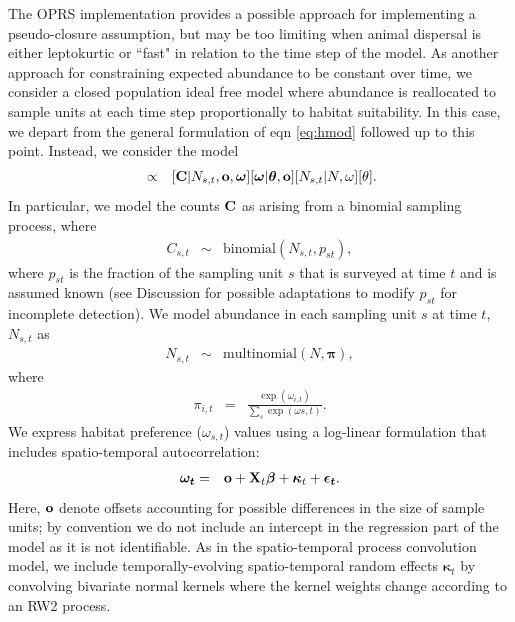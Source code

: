 \documentclass[times,mee,doublespace,]{besauth2}
\begin{document}
The OPRS implementation provides a possible approach for implementing a pseudo-closure assumption, but may be too limiting when animal dispersal is either leptokurtic or ``fast" in relation to the time step of the model.  As another approach for constraining expected abundance to be constant over time, we consider a closed population
ideal free model where abundance is reallocated to sample units at each time step proportionally to habitat suitability.  In this case, we depart from the general formulation of eqn \ref{eq:hmod} followed up to this point.  Instead, we consider the model
\begin{eqnarray}
  [N, N_{s,t}, \boldsymbol{\omega},\boldsymbol{\theta} | {\bf C},{\bf o},{\bf p}] & \propto & [{\bf C} | N_{s,t}, {\bf o}, \boldsymbol{\omega}] [\boldsymbol{\omega} | \boldsymbol{\theta},{\bf o}] [N_{s,t}|N,\omega] [\theta].
  \label{eq:cpif-post}
\end{eqnarray}
In particular, we model the counts ${\bf C}$ as arising from a binomial sampling process, where
\begin{eqnarray*}
  C_{s,t} & \sim & \textrm{binomial}(N_{s,t}, p_{st}),
\end{eqnarray*}
where $p_{st}$ is the fraction of the sampling unit $s$ that is surveyed at time $t$ and is assumed known (see Discussion for possible adaptations to modify $p_{st}$ for incomplete detection).
We model abundance in each sampling unit $s$ at time $t$, $N_{s,t}$ as
\begin{eqnarray*}
  N_{s,t} & \sim & \textrm{multinomial}(N, \boldsymbol{\pi}),
\end{eqnarray*}
where
\begin{eqnarray*}
  \pi_{i,t} & = & \frac{\exp(\omega_{i,t})}{\sum_s \exp(\omega{s,t})}.
\end{eqnarray*}
We express habitat preference ($\omega_{s,t}$) values using a log-linear formulation that includes spatio-temporal autocorrelation:
\begin{eqnarray*}
  \boldsymbol{\omega_t} & = & {\bf o} + {\bf X}_t \boldsymbol{\beta} + \boldsymbol{\kappa}_t + \boldsymbol{\epsilon_t}.
\end{eqnarray*}
Here, ${\bf o}$ denote offsets accounting for possible differences in the size of sample units; by convention we do not include an intercept in the regression part of the model as it is not identifiable.
As in the spatio-temporal process convolution model, we include temporally-evolving spatio-temporal random effects $\boldsymbol{\kappa}_t$ by convolving bivariate normal kernels where the kernel weights change according to an RW2 process.
\end{document}
